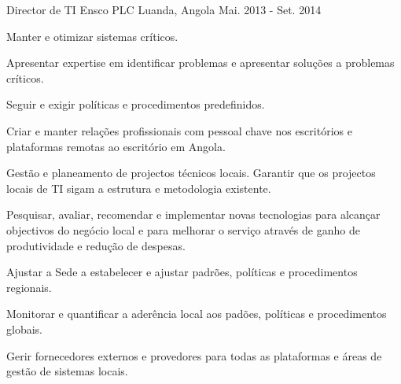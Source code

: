 \begin{cventries}

\cventry
{Director de TI} %
{Ensco PLC} %
{Luanda, Angola} %
{Mai. 2013 - Set. 2014} %
{ %
\begin{cvitems}
\item {Manter e otimizar sistemas críticos.}
\item {Apresentar expertise em identificar problemas e apresentar soluções a problemas críticos.}
\item {Seguir e exigir políticas e procedimentos predefinidos.}
\item {Criar e manter relações profissionais com pessoal chave nos escritórios e plataformas remotas ao escritório em Angola.}
\item {Gestão e planeamento de projectos técnicos locais. Garantir que os projectos locais de TI sigam a estrutura e metodologia existente.}
\item {Pesquisar, avaliar, recomendar e implementar novas tecnologias para alcançar objectivos do negócio local e para melhorar o serviço através de ganho de produtividade e redução de despesas.}
\item {Ajustar a Sede a estabelecer e ajustar padrões, políticas e procedimentos regionais.}
\item {Monitorar e quantificar a aderência local aos padões, políticas e procedimentos globais.}
\item {Gerir fornecedores externos e provedores para todas as plataformas e áreas de gestão de sistemas locais.}
\end{cvitems}
}



\end{cventries}
